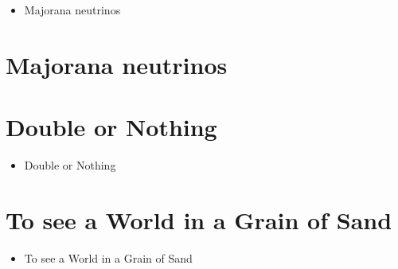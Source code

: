 \documentclass[9pt]{beamer}
\begin{document}
\begin{frame}
\begin{itemize}
\item Majorana neutrinos
\end{itemize}
\end{frame}

\section{Majorana neutrinos}




%

\section{Double or Nothing}

\begin{frame}
\begin{itemize}
\item Double or Nothing
\end{itemize}
\end{frame}


\section{To see a World in a Grain of Sand }

\begin{frame}
\begin{itemize}
\item To see a World in a Grain of Sand
\end{itemize}
\end{frame}

\end{document}
